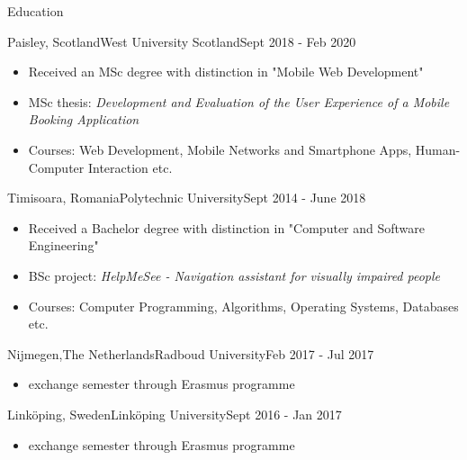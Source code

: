 \documentclass[]{mcdowellcv}
\begin{document}
	\begin{cvsection}{Education}
		\begin{cvsubsection}{Paisley, Scotland}{West University Scotland}{Sept 2018 - Feb 2020}
       		\begin{itemize}
            	\item Received an MSc degree with distinction in "Mobile Web Development"
        		\item MSc thesis: \textit{Development and Evaluation of the User Experience of a Mobile Booking Application}
				\item Courses: Web Development, Mobile Networks and Smartphone Apps, Human-Computer Interaction etc.
			\end{itemize}
		\end{cvsubsection}

		\begin{cvsubsection}{Timisoara, Romania}{Polytechnic University}{Sept 2014 - June 2018}
			\begin{itemize}
				\item Received a Bachelor degree with distinction in "Computer and Software Engineering"
				\item BSc project: \textit{HelpMeSee - Navigation assistant for visually impaired people}
				\item Courses: Computer Programming, Algorithms, Operating Systems, Databases etc.
			\end{itemize}
		\end{cvsubsection}
	
		\begin{cvsubsection}{Nijmegen,The Netherlands}{Radboud University}{Feb 2017 - Jul 2017}
			\begin{itemize}
				\item exchange semester through Erasmus programme 
			\end{itemize}
		\end{cvsubsection}

		\begin{cvsubsection}{Linköping, Sweden}{Linköping University}{Sept 2016 - Jan 2017}
			\begin{itemize}
				\item exchange semester through Erasmus programme 
			\end{itemize}
		\end{cvsubsection}

	\end{cvsection}
	
\end{document}
